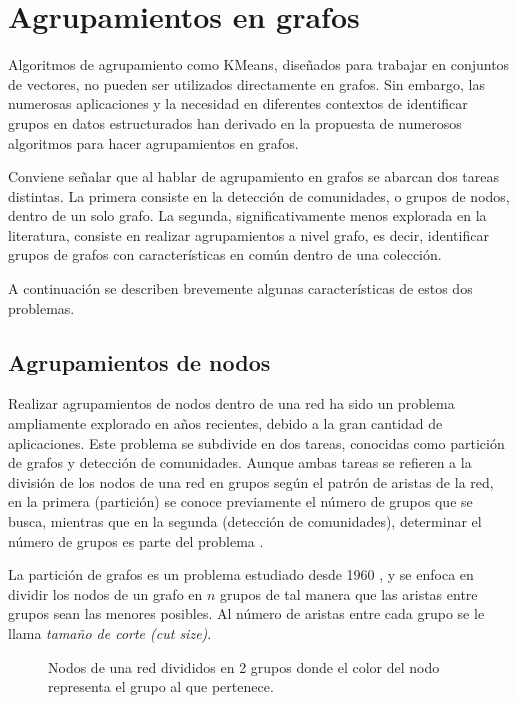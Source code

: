 \label{algorithms:k-means}

\section{Agrupamientos en grafos}
Algoritmos de agrupamiento como KMeans, diseñados para trabajar en conjuntos de vectores, no pueden ser utilizados directamente en grafos. Sin embargo, las numerosas aplicaciones y la necesidad en diferentes contextos de identificar grupos en datos estructurados han derivado en la propuesta de numerosos algoritmos para hacer agrupamientos en grafos.

Conviene señalar que al hablar de agrupamiento en grafos se abarcan dos tareas distintas. La primera consiste en la detección de comunidades, o grupos de nodos, dentro de un solo grafo. La segunda, significativamente menos explorada en la literatura, consiste en realizar agrupamientos a nivel grafo, es decir, identificar grupos de grafos con características en común dentro de una colección.  

A continuación se describen brevemente algunas características de estos dos problemas. 
\subsection{Agrupamientos de nodos}
\label{section:nodeclustering}
Realizar agrupamientos de nodos dentro de una red ha sido un problema ampliamente explorado en años recientes, debido a la gran cantidad de aplicaciones. Este problema se subdivide en dos tareas, conocidas como partición de grafos y detección de comunidades. Aunque ambas tareas se refieren a la división de los nodos de una red en grupos según el patrón de aristas de la red,  en la primera (partición) se conoce previamente el número de grupos que se busca, mientras que en la segunda (detección de comunidades), determinar el número de grupos es parte del problema \cite{newman_networks_2010}.

La partición de grafos es un problema estudiado desde 1960 \cite{newman_networks_2010}, y se enfoca en dividir los nodos de un grafo en $n$ grupos de tal manera que las aristas entre grupos sean las menores posibles. Al número de aristas entre cada grupo se le llama \emph{tamaño de corte (cut size)}. 

\begin{figure}[htbp]
   \centering
   
    \caption{Nodos de una red divididos en 2 grupos donde el color del nodo representa el grupo al que pertenece.}
    \label{fig:partition}
\end{figure}

